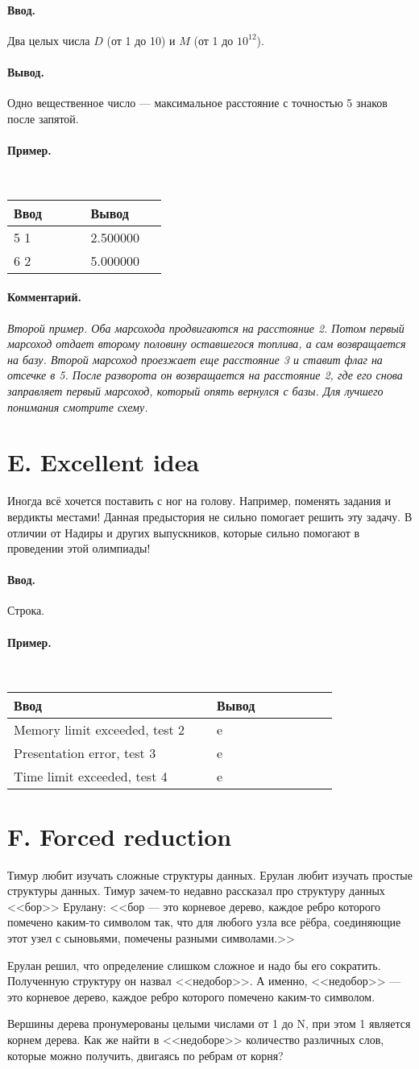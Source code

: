 \documentclass[12pt, a5paper]{article}
\newcommand{\informat}[1]
{
	\paragraph{Ввод.\\} #1
}
\newcommand{\outformat}[1]
{
	\paragraph{Вывод.\\} #1
}
\newcommand{\examplee}[4]
{
	\paragraph{Пример.\\}
	{\tt
	\begin{tabular}{|p{0.4\linewidth}|p{0.4\linewidth}|}
	\hline
	Ввод 	& Вывод  	\\
	\hline
	#1 		& #2 		\\
	\hline
	#3		& #4		\\
	\hline
	\end{tabular}
	}
}
\newcommand{\examplEEE}[6]
{
	\paragraph{Пример.\\}
	{\tt
	\begin{tabular}{|p{0.5\linewidth}|p{0.3\linewidth}|}
	\hline
	Ввод 	& Вывод  	\\
	\hline
	#1 		& #2 		\\
	\hline
	#3		& #4		\\
	\hline
	#5		& #6		\\
	\hline
	\end{tabular}
	}
}
\newcommand{\excomm}[1]
{
	\paragraph{Комментарий. \\}
	\textit{#1}
}
\begin{document}
\informat{Два целых числа $D$ (от 1 до 10) и $M$ (от 1 до $10^{12}$).}

\outformat{Одно вещественное число --- максимальное расстояние с точностью 5 знаков после запятой.}

\examplee{5 1}{2.500000}{6 2}{5.000000}

\excomm{Второй пример. Оба марсохода продвигаются на расстояние 2. Потом первый марсоход отдает второму половину оставшегося топлива, а сам возвращается на базу. Второй марсоход проезжает еще расстояние 3 и ставит флаг на отсечке в 5. После разворота он возвращается на расстояние 2, где его снова заправляет первый марсоход, который опять вернулся с базы. Для лучшего понимания смотрите схему.}





\section*{E. Excellent idea}
 


Иногда всё хочется поставить с ног на голову. Например, поменять задания и вердикты местами! Данная предыстория не сильно помогает решить эту задачу. В отличии от Надиры и других выпускников, которые сильно помогают в проведении этой олимпиады!

\informat{Строка.}

\examplEEE{Memory limit exceeded, test 2}{e}{Presentation error, test 3}{e}{Time limit exceeded, test 4}{e}




\section*{F. Forced reduction}
 

Тимур любит изучать сложные структуры данных. Ерулан любит изучать простые структуры данных. Тимур зачем-то недавно рассказал про структуру данных <<бор>> Ерулану: <<бор --- это корневое дерево, каждое ребро которого помечено каким-то символом так, что для любого узла все рёбра, соединяющие этот узел с сыновьями, помечены разными символами.>>

Ерулан решил, что определение слишком сложное и надо бы его сократить. Полученную структуру он назвал <<недобор>>. А именно, <<недобор>> --- это корневое дерево, каждое ребро которого помечено каким-то символом.

Вершины дерева пронумерованы целыми числами от 1 до N, при этом 1 является корнем дерева. Как же найти в <<недоборе>> количество различных слов, которые можно получить, двигаясь по ребрам от корня? 
\end{document}
